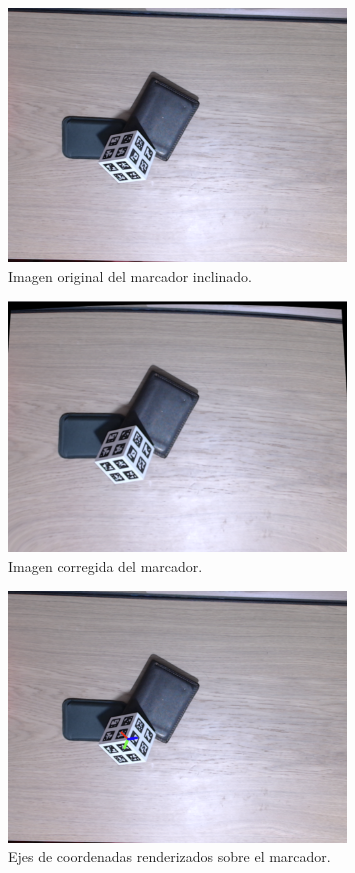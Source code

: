 \begin{figure}[H]
	\centering
	\includegraphics[width=0.8\textwidth]{imaxes/tilted_raw_image.png}
	\caption{Imagen original del marcador inclinado.}
	\label{fig:tilted_raw}
\end{figure}

\begin{figure}[H]
	\centering
	\includegraphics[width=0.8\textwidth]{imaxes/tilted_undistorted.png}
	\caption{Imagen corregida del marcador.}
	\label{fig:tilted_undistorted}
\end{figure}

\begin{figure}[H]
	\centering
	\includegraphics[width=0.8\textwidth]{imaxes/tilted_cube_axis.png}
	\caption{Ejes de coordenadas renderizados sobre el marcador.}
	\label{fig:tilted_axes}
\end{figure}

